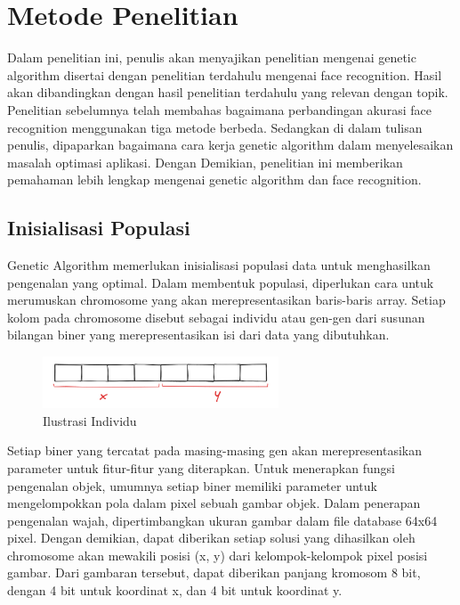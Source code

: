 \documentclass[conference]{IEEEtran}
\begin{document}
\begin{itemize}
\end{itemize}
    

\section{Metode Penelitian}
Dalam penelitian ini, penulis akan menyajikan penelitian mengenai genetic algorithm disertai dengan penelitian terdahulu mengenai face recognition. Hasil akan dibandingkan dengan hasil penelitian terdahulu yang relevan dengan topik. Penelitian sebelumnya telah membahas bagaimana perbandingan akurasi face recognition menggunakan tiga metode berbeda. Sedangkan di dalam tulisan penulis, dipaparkan bagaimana cara kerja genetic algorithm dalam menyelesaikan masalah optimasi aplikasi. Dengan Demikian, penelitian ini memberikan pemahaman lebih lengkap mengenai genetic algorithm dan face recognition.

\subsection{Inisialisasi Populasi}

Genetic Algorithm memerlukan inisialisasi populasi data untuk menghasilkan pengenalan yang optimal. Dalam membentuk populasi, diperlukan cara untuk merumuskan chromosome yang akan merepresentasikan baris-baris array. \cite{unknown2016} Setiap kolom pada chromosome disebut sebagai individu atau gen-gen dari susunan bilangan biner yang merepresentasikan isi dari data yang dibutuhkan.

\begin{figure}[htp]
    \centering
    \includegraphics[width=7cm]{images/inisialisasi populasi_1.png}
    \caption{Ilustrasi Individu}
    \label{fig:individu}
\end{figure}

Setiap biner yang tercatat pada masing-masing gen akan merepresentasikan parameter untuk fitur-fitur yang diterapkan.\cite{Hussein2020} Untuk menerapkan fungsi pengenalan objek, umumnya setiap biner memiliki parameter untuk mengelompokkan pola dalam pixel sebuah gambar objek. Dalam penerapan pengenalan wajah, dipertimbangkan ukuran gambar dalam file database 64x64 pixel. Dengan demikian, dapat diberikan setiap solusi yang dihasilkan oleh chromosome akan mewakili posisi (x, y) dari kelompok-kelompok pixel posisi gambar. Dari gambaran tersebut, dapat diberikan panjang kromosom 8 bit, dengan 4 bit untuk koordinat x, dan 4 bit untuk koordinat y.
\end{document}
